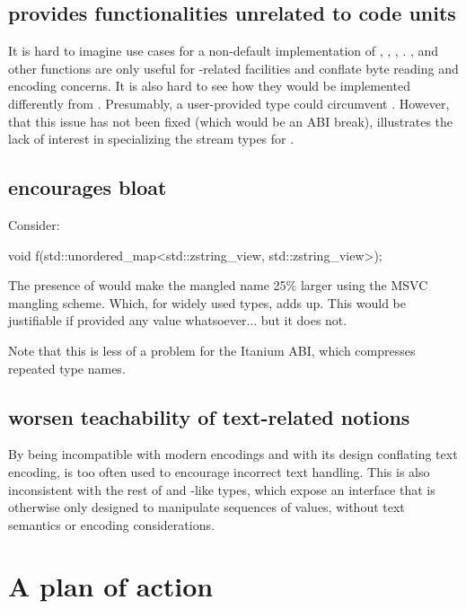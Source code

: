 \documentclass{wg21}
\begin{document}
\subsection{ provides functionalities unrelated to code units}

It is hard to imagine use cases for a non-default implementation of , , , .
,  and other functions are only useful for -related facilities and conflate byte reading and encoding concerns.
It is also hard to see how they would be implemented differently from .
Presumably, a user-provided  type could circumvent . However, that this issue has not been fixed (which would be an ABI break),
illustrates the lack of interest in specializing the stream types for .


\subsection{ encourages bloat}
Consider:
\begin{colorblock}
void f(std::unordered_map<std::zstring_view, std::zstring_view>);
\end{colorblock}

The presence of  would make the mangled
name 25\% larger using the MSVC mangling scheme. Which, for widely used types, adds up.
This would be justifiable if  provided any value whatsoever... but it does not.

Note that this is less of a problem for the Itanium ABI, which compresses repeated type names.

\subsection{ worsen teachability of text-related notions}

By being incompatible with modern encodings and with its design conflating text encoding, 
 is too often used to encourage incorrect text handling. This is also inconsistent with
the rest of  and -like types, which expose an interface that is otherwise only designed to manipulate sequences of values, without text semantics or encoding considerations.

\section{A plan of action}
\end{document}
